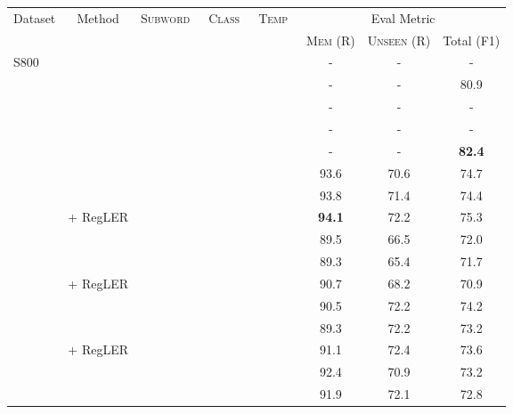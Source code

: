 \documentclass[11pt]{article}
\newcommand{\cmark}{\ding{51}}\newcommand{\xmark}{\ding{55}}\newcommand{\cross}{\ding{61}}\newcommand{\mb}[1]{\textcolor{red}{#1}}
\begin{document}
\begin{table*}[t]
\centering
\begin{adjustbox}{width=0.75\textwidth}
\begin{tabular}{ l l c c c c c c c }
\toprule
\multicolumn{1}{c}{\multirow{2}{*}{Dataset}} & \multicolumn{1}{c}{\multirow{2}{*}{Method}} & \multicolumn{1}{c}{\multirow{2}{*}{\textsc{Subword}~}} & \multicolumn{1}{c}{\multirow{2}{*}{\textsc{Class}~}} &
\multicolumn{1}{c}{\multirow{2}{*}{\textsc{Temp}~}} & \multicolumn{4}{c}{Eval Metric}       \\ \cmidrule{6-9} 
\multicolumn{1}{c}{} & & & & & 
\textsc{Mem} (R) & 
\textsc{Unseen} (R) & 
\multicolumn{2}{c}{Total (F1)} \\ \midrule
\multirow{21}{*}{S800}
&  & \xmark & \xmark & \xmark & - & - & \multicolumn{2}{c}{-} \\
&  & \xmark & \xmark & \xmark & - & - & \multicolumn{2}{c}{80.9}  \\
&  & \xmark & \xmark & \xmark & - & - & \multicolumn{2}{c}{-} \\
&  & \xmark & \xmark & \xmark & - & - & \multicolumn{2}{c}{-} \\
&  & \xmark & \xmark & \xmark & - & - & \multicolumn{2}{c}{\textbf{82.4}} \\
\cmidrule{2-9}
&  & \xmark & \xmark & \xmark & 93.6 & 70.6 & \multicolumn{2}{c}{74.7} \\
&  & \xmark & \xmark & \xmark & 93.8 & 71.4 & \multicolumn{2}{c}{74.4} \\
&  + RegLER & \cmark & \cmark & \cmark & \textbf{94.1} & 72.2 & \multicolumn{2}{c}{75.3} \\
\cmidrule{2-9}
&  & \xmark & \xmark & \xmark & 89.5 & 66.5 & \multicolumn{2}{c}{72.0} \\
&  & \xmark & \xmark & \xmark & 89.3 & 65.4 & \multicolumn{2}{c}{71.7} \\
&  + RegLER & \cmark & \cmark & \cmark & 90.7 & 68.2 & \multicolumn{2}{c}{70.9} \\
\cmidrule{2-9}
&  & \xmark & \xmark & \xmark & 90.5 & 72.2 & \multicolumn{2}{c}{74.2} \\
&  & \xmark & \xmark & \xmark & 89.3 & 72.2 & \multicolumn{2}{c}{73.2} \\
&  + RegLER & \cmark & \cmark & \cmark & 91.1 & 72.4 & \multicolumn{2}{c}{73.6} \\
\cmidrule{2-9}
&  & \xmark & \xmark & \xmark & 92.4 & 70.9 &  \multicolumn{2}{c}{73.2} \\
&  & \xmark & \xmark & \xmark & 91.9 & 72.1 & \multicolumn{2}{c}{72.8} \\

\end{tabular}
\end{adjustbox}
\end{table*}
\end{document}
